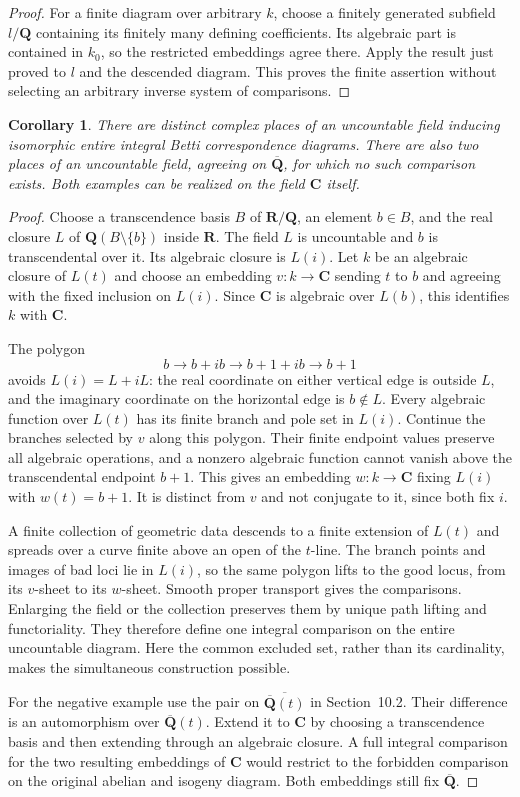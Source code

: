 \documentclass[11pt]{article}
\newtheorem{corollary}[theorem]{Corollary}
\theoremstyle{definition}\newtheorem{definition}[theorem]{Definition}
\theoremstyle{remark}\newtheorem{remark}[theorem]{Remark}
\newcommand{\Q}{\mathbf Q}\newcommand{\Z}{\mathbf Z}
\newcommand{\R}{\mathbf R}\newcommand{\C}{\mathbf C}
\newcommand{\Qb}{\overline{\mathbf Q}}\newcommand{\Fp}{\mathbf F_p}
\begin{document}
\begin{proof}
For a finite diagram over arbitrary $k$, choose a finitely generated
subfield $l/\Q$ containing its finitely many defining coefficients. Its
algebraic part is contained in $k_0$, so the restricted embeddings agree
there. Apply the result just proved to $l$ and the descended diagram.
This proves the finite assertion without selecting an arbitrary inverse
system of comparisons.
\end{proof}

\begin{corollary}\label{cor:uncountable-comparisons}
There are distinct complex places of an uncountable field inducing
isomorphic entire integral Betti correspondence diagrams. There are also
two places of an uncountable field, agreeing on $\Qb$, for which no such
comparison exists. Both examples can be realized on the field $\C$ itself.
\end{corollary}

\begin{proof}
Choose a transcendence basis $B$ of $\R/\Q$, an element $b\in B$, and the
real closure $L$ of $\Q(B\setminus\{b\})$ inside $\R$. The field $L$ is
uncountable and $b$ is transcendental over it. Its algebraic closure is
$L(i)$. Let $k$ be an algebraic closure of $L(t)$ and choose an embedding
$v:k\to\C$ sending $t$ to $b$ and agreeing with the fixed inclusion on
$L(i)$. Since $\C$ is algebraic over $L(b)$, this identifies $k$ with $\C$.

The polygon
\[
 b\longrightarrow b+ib\longrightarrow b+1+ib\longrightarrow b+1
\]
avoids $L(i)=L+iL$: the real coordinate on either vertical edge is outside
$L$, and the imaginary coordinate on the horizontal edge is $b\notin L$.
Every algebraic function over $L(t)$ has its finite branch and pole set in
$L(i)$. Continue the branches selected by $v$ along this polygon. Their
finite endpoint values preserve all algebraic operations, and a nonzero
algebraic function cannot vanish above the transcendental endpoint $b+1$.
This gives an embedding $w:k\to\C$ fixing $L(i)$ with $w(t)=b+1$.
It is distinct from $v$ and not conjugate to it, since both fix $i$.

A finite collection of geometric data descends to a finite extension of
$L(t)$ and spreads over a curve finite above an open of the $t$-line. The
branch points and images of bad loci lie in $L(i)$, so the same polygon lifts
to the good locus, from its $v$-sheet to its $w$-sheet. Smooth proper
transport gives the comparisons. Enlarging the field or the collection
preserves them by unique path lifting and functoriality. They therefore
define one integral comparison on the entire uncountable diagram.
Here the common excluded set, rather than its cardinality, makes the
simultaneous construction possible.

For the negative example use the pair on
$\overline{\Qb(t)}$ in Section~10.2. Their difference is an automorphism
over $\Qb(t)$. Extend it to $\C$ by choosing a transcendence basis and then
extending through an algebraic closure. A full integral comparison for the
two resulting embeddings of $\C$ would restrict to the forbidden comparison
on the original abelian and isogeny diagram. Both embeddings still fix
$\Qb$.
\end{proof}
\end{document}
